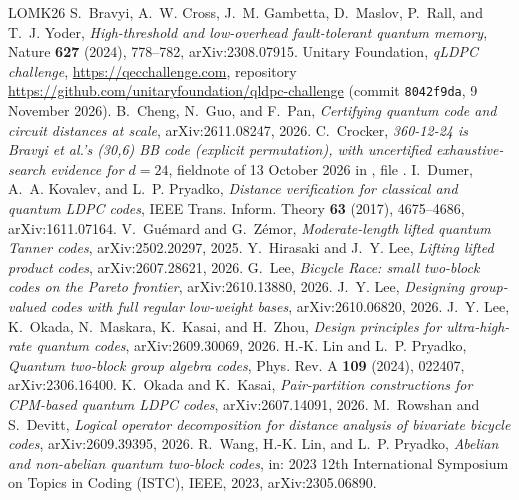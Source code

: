 \documentclass[11pt]{amsart}
\theoremstyle{definition}
\theoremstyle{remark}
\begin{document}
\begin{thebibliography}{LOMK26}
 S.~Bravyi, A.~W. Cross, J.~M. Gambetta, D.~Maslov, P.~Rall, and T.~J. Yoder, \emph{High-threshold and low-overhead fault-tolerant quantum memory}, Nature \textbf{627} (2024), 778--782, arXiv:2308.07915.
 Unitary Foundation, \emph{qLDPC challenge}, \url{https://qecchallenge.com}, repository \url{https://github.com/unitaryfoundation/qldpc-challenge} (commit \texttt{8042f9da}, 9 November 2026).
 B.~Cheng, N.~Guo, and F.~Pan, \emph{Certifying quantum code and circuit distances at scale}, arXiv:2611.08247, 2026.
 C.~Crocker, \emph{360-12-24 is Bravyi et al.'s (30,6) BB code (explicit permutation), with uncertified exhaustive-search evidence for $d=24$}, fieldnote of 13 October 2026 in \cite{Board}, file .
 I.~Dumer, A.~A. Kovalev, and L.~P. Pryadko, \emph{Distance verification for classical and quantum LDPC codes}, IEEE Trans. Inform. Theory \textbf{63} (2017), 4675--4686, arXiv:1611.07164.
 V.~Gu\'emard and G.~Z\'emor, \emph{Moderate-length lifted quantum Tanner codes}, arXiv:2502.20297, 2025.
 Y.~Hirasaki and J.~Y. Lee, \emph{Lifting lifted product codes}, arXiv:2607.28621, 2026.
 G.~Lee, \emph{Bicycle Race: small two-block codes on the Pareto frontier}, arXiv:2610.13880, 2026.
 J.~Y. Lee, \emph{Designing group-valued codes with full regular low-weight bases}, arXiv:2610.06820, 2026.
 J.~Y. Lee, K.~Okada, N.~Maskara, K.~Kasai, and H.~Zhou, \emph{Design principles for ultra-high-rate quantum codes}, arXiv:2609.30069, 2026.
 H.-K. Lin and L.~P. Pryadko, \emph{Quantum two-block group algebra codes}, Phys. Rev. A \textbf{109} (2024), 022407, arXiv:2306.16400.
 K.~Okada and K.~Kasai, \emph{Pair-partition constructions for CPM-based quantum LDPC codes}, arXiv:2607.14091, 2026.
 M.~Rowshan and S.~Devitt, \emph{Logical operator decomposition for distance analysis of bivariate bicycle codes}, arXiv:2609.39395, 2026.
 R.~Wang, H.-K. Lin, and L.~P. Pryadko, \emph{Abelian and non-abelian quantum two-block codes}, in: 2023 12th International Symposium on Topics in Coding (ISTC), IEEE, 2023, arXiv:2305.06890.
\end{thebibliography}
\end{document}
